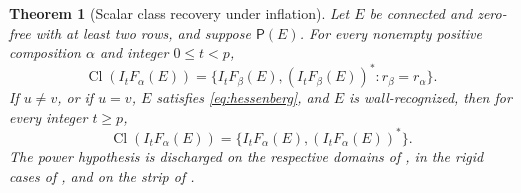 \documentclass[11pt,a4paper]{amsart}
\numberwithin{equation}{section}
\theoremstyle{plain}
\newtheorem{theorem}{Theorem}[section]
\theoremstyle{definition}
\begin{document}
\begin{theorem}[Scalar class recovery under inflation]\label{thm:main}
Let \(E\) be connected and zero-free with at least two rows, and suppose \(\mathsf P(E)\).  For every nonempty positive composition \(\alpha\) and integer \(0\le t<p\),
\begin{equation}\label{eq:prewall-class}
 \operatorname{Cl}(I_tF_\alpha(E))
 =\{I_tF_\beta(E),(I_tF_\beta(E))^*:r_\beta=r_\alpha\}.
\end{equation}
If \(u\ne v\), or if \(u=v\), \(E\) satisfies \eqref{eq:hessenberg}, and \(E\) is wall-recognized, then for every integer \(t\ge p\),
\begin{equation}\label{eq:postwall-class}
 \operatorname{Cl}(I_tF_\alpha(E))
 =\{I_tF_\alpha(E),(I_tF_\alpha(E))^*\}.
\end{equation}
The power hypothesis is discharged on the respective domains of , in the rigid cases of , and on the strip of .
\end{theorem}
\end{document}
